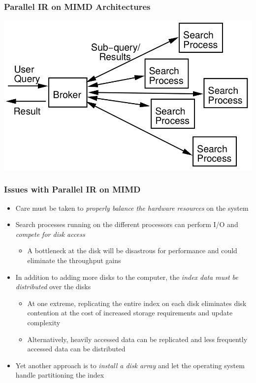 \documentclass{beamer}
\begin{document}
\begin{frame}
    \frametitle{Parallel IR on MIMD Architectures}
    
    \centering
    \includegraphics[width=.9\textwidth]{broker-mimd}
\end{frame}

\begin{frame}
    \frametitle{Issues with Parallel IR on MIMD}
    
    \begin{itemize}
    \item Care must be taken to \emph{properly balance the hardware resources}
        on the system
    \item Search processes running on the different processors can perform I/O
        and \emph{compete for disk access}
        \begin{itemize}
        \item A bottleneck at the disk will be disastrous for performance and
            could eliminate the throughput gains
        \end{itemize}
    \item In addition to adding more disks to the computer, the \emph{index
          data must be distributed} over the disks
        \begin{itemize}
        \item At one extreme, replicating the entire index on each disk
            eliminates disk contention at the cost of increased storage
            requirements and update complexity
        \item Alternatively, heavily accessed data can be replicated and less
            frequently accessed data can be distributed
        \end{itemize}
    \item Yet another approach is to \emph{install a disk array} and let the
        operating system handle partitioning the index
    \end{itemize}
\end{frame}
\end{document}
